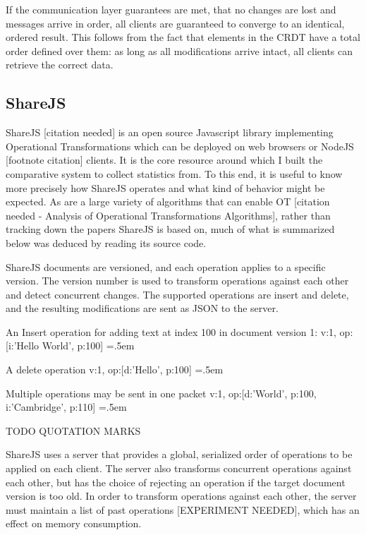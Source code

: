 \documentclass[12pt,a4paper,twoside,openright]{report}
\newenvironment{lcverbatim}
 {\SaveVerbatim{cverb}}
 {\endSaveVerbatim
  \flushleft\fboxrule=0pt\fboxsep=.5em
  \colorbox{cverbbg}{%
    \makebox[\dimexpr\linewidth-2\fboxsep][l]{\BUseVerbatim{cverb}}%
  }
  \endflushleft
}
\begin{document}
	If the communication layer guarantees are met, that no changes are lost and messages arrive in order, all clients are guaranteed to converge to an identical, ordered result. This follows from the fact that elements in the CRDT have a total order defined over them: as long as all modifications arrive intact, all clients can retrieve the correct data.

	\subsection{ShareJS}
	
	ShareJS [citation needed] is an open source Javascript library implementing Operational Transformations which can be deployed on web browsers or NodeJS [footnote citation] clients. It is the core resource around which I built the comparative system to collect statistics from. To this end, it is useful to know more precisely how ShareJS operates and what kind of behavior might be expected. As are a large variety of algorithms that can enable OT [citation needed - Analysis of Operational Transformations Algorithms], rather than tracking down the papers ShareJS is based on, much of what is summarized below was deduced by reading its source code.
	
	ShareJS documents are versioned, and each operation applies to a specific version. The version number is used to transform operations against each other and detect concurrent changes. The supported operations are insert and delete, and the resulting modifications are sent as JSON to the server.
	
	An Insert operation for adding text at index 100 in document version 1:
\begin{lcverbatim}
{v:1, op:[{i:'Hello World', p:100}]}
\end{lcverbatim}

	A delete operation
\begin{lcverbatim}
{v:1, op:[{d:'Hello', p:100}]}
\end{lcverbatim}

	Multiple operations may be sent in one packet
\begin{lcverbatim}
{v:1, op:[{d:'World', p:100}, {i:'Cambridge', p:110}]}
\end{lcverbatim}

TODO QUOTATION MARKS

\vspace{5mm}

	ShareJS uses a server that provides a global, serialized order of operations to be applied on each client. The server also transforms concurrent operations against each other, but has the choice of rejecting an operation if the target document version is too old. In order to transform operations against each other, the server must maintain a list of past operations [EXPERIMENT NEEDED], which has an effect on memory consumption.
	
\end{document}
